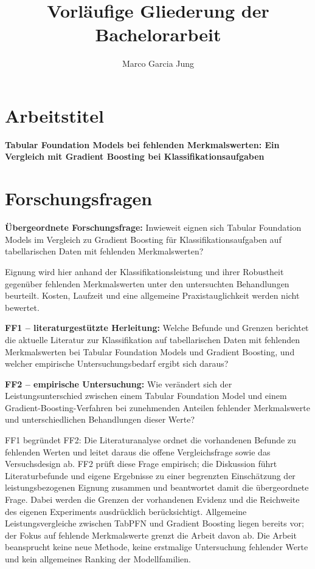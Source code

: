 \documentclass[11pt,a4paper]{article}
\title{Vorläufige Gliederung der Bachelorarbeit}
\author{Marco Garcia Jung}
\date{}
\begin{document}
\maketitle

\section*{Arbeitstitel}

\textbf{Tabular Foundation Models bei fehlenden Merkmalswerten: Ein
Vergleich mit Gradient Boosting bei Klassifikationsaufgaben}

\section*{Forschungsfragen}

\textbf{Übergeordnete Forschungsfrage:}
Inwieweit eignen sich Tabular Foundation Models im Vergleich zu
Gradient Boosting für Klassifikationsaufgaben auf tabellarischen Daten
mit fehlenden Merkmalswerten?

Eignung wird hier anhand der Klassifikationsleistung und ihrer
Robustheit gegenüber fehlenden Merkmalswerten unter den untersuchten
Behandlungen beurteilt. Kosten, Laufzeit und eine allgemeine
Praxistauglichkeit werden nicht bewertet.

\medskip
\noindent\textbf{FF1 -- literaturgestützte Herleitung:}
Welche Befunde und Grenzen berichtet die aktuelle Literatur zur
Klassifikation auf tabellarischen Daten mit fehlenden Merkmalswerten
bei Tabular Foundation Models und Gradient Boosting, und welcher
empirische Untersuchungsbedarf ergibt sich daraus?

\medskip
\noindent\textbf{FF2 -- empirische Untersuchung:}
Wie verändert sich der Leistungsunterschied zwischen einem Tabular
Foundation Model und einem Gradient-Boosting-Verfahren bei zunehmenden
Anteilen fehlender Merkmalswerte und unterschiedlichen Behandlungen
dieser Werte?

\medskip
FF1 begründet FF2: Die Literaturanalyse ordnet die vorhandenen Befunde
zu fehlenden Werten und leitet daraus die offene Vergleichsfrage sowie
das Versuchsdesign ab. FF2 prüft diese Frage empirisch; die Diskussion
führt Literaturbefunde und eigene Ergebnisse zu einer begrenzten
Einschätzung der leistungsbezogenen Eignung zusammen und beantwortet
damit die übergeordnete Frage. Dabei werden die Grenzen der vorhandenen
Evidenz und die Reichweite des eigenen Experiments ausdrücklich
berücksichtigt. Allgemeine Leistungsvergleiche
zwischen TabPFN und Gradient Boosting liegen bereits vor; der Fokus
auf fehlende Merkmalswerte grenzt die Arbeit davon ab. Die Arbeit
beansprucht keine neue Methode, keine erstmalige Untersuchung fehlender
Werte und kein allgemeines Ranking der Modellfamilien.
\end{document}
